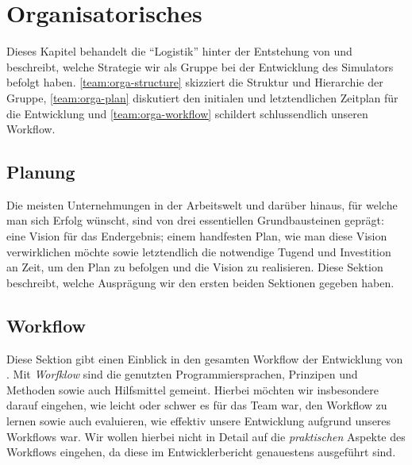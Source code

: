 
\section{Organisatorisches}
\label{team:orga}

Dieses Kapitel behandelt die ``Logistik'' hinter der Entstehung von \erasim{} und
beschreibt, welche Strategie wir als Gruppe bei der Entwicklung des Simulators
befolgt haben. \autoref{team:orga-structure} skizziert die Struktur und
Hierarchie der Gruppe, \autoref{team:orga-plan} diskutiert den initialen und
letztendlichen Zeitplan für die Entwicklung und
\autoref{team:orga-workflow} schildert schlussendlich unseren Workflow.



\subsection{Planung}
\label{team:orga-plan}

Die meisten Unternehmungen in der Arbeitswelt und darüber hinaus, für welche man
sich Erfolg wünscht, sind von drei essentiellen Grundbausteinen geprägt: eine
Vision für das Endergebnis; einem handfesten Plan, wie man diese Vision
verwirklichen möchte sowie letztendlich die notwendige Tugend und Investition an
Zeit, um den Plan zu befolgen und die Vision zu realisieren. Diese Sektion
beschreibt, welche Ausprägung wir den ersten beiden Sektionen gegeben haben.





\subsection{Workflow}
\label{team:orga-workflow}

Diese Sektion gibt einen Einblick in den gesamten Workflow der Entwicklung von
\erasim{}. Mit \emph{Worfklow} sind die genutzten Programmiersprachen, Prinzipen und Methoden sowie auch Hilfsmittel gemeint. Hierbei möchten wir insbesondere darauf eingehen, wie leicht oder schwer es für das Team war, den Workflow zu lernen sowie auch evaluieren, wie effektiv unsere Entwicklung aufgrund unseres Workflows war. Wir wollen hierbei nicht in Detail auf die \emph{praktischen} Aspekte des Workflows eingehen, da diese im Entwicklerbericht genauestens ausgeführt sind.




